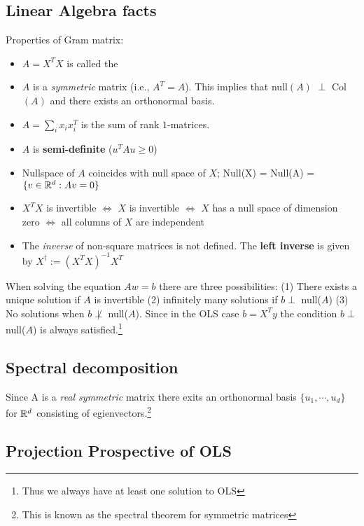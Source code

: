 \subsection{Linear Algebra facts}
Properties of Gram matrix:
\begin{itemize}
    \item $A = X^T X$ is called the 
    \item $A$ is a \textit{symmetric} matrix (i.e., $A^T = A$). This implies that null$(A)$ $\perp$ Col$(A)$ and there exists an orthonormal basis.
    \item $A = \sum_{i}x_ix_{i}^T$ is the sum of rank $1$-matrices.
    \item $A$ is \textbf{semi-definite} ($u^TAu \geq 0$)
    \item Nullspace of $A$ coincides with null space of $X$; Null(X) = Null(A) = $\{v \in \mathbb R^d : Av =0\}$
    \item $X^T X$ is invertible $\iff$ $X$ is invertible $\iff$ $X$ has a null space of dimension zero $\iff$ all columns of $X$ are independent
    \item The \textit{inverse} of non-square matrices is not defined. The \textbf{left inverse} is given by $X^{\dag} := (X^TX)^{-1}X^T $
\end{itemize}
When solving the equation $Aw =b$ there are three possibilities: (1) There exists a unique solution if $A$ is invertible (2) infinitely many solutions if $b \perp$ null($A$) (3) No solutions when $b \not\perp$ null($A$). Since in the OLS case $b = X^Ty$ the condition $b \perp$ null($A$) is always satisfied.\footnote{Thus we always have at least one solution to OLS}
\subsection{Spectral decomposition}
Since A is a \textit{real symmetric} matrix there exits an orthonormal basis $\{u_1, \cdots, u_d\}$ for $\mathbb R^d$ consisting of egienvectors.\footnote{This is known as the spectral theorem for symmetric matrices}
\subsection{Projection Prospective of OLS}
 